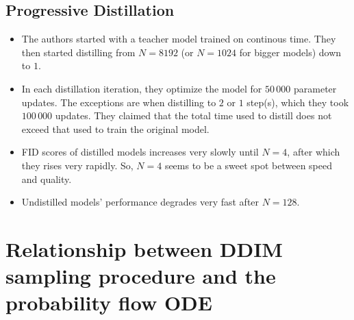 \documentclass[10pt]{article}
\begin{document}
\subsection{Progressive Distillation}

\begin{itemize}
  \item The authors started with a teacher model trained on continous time. They then started distilling from $N = 8192$ (or $N = 1024$ for bigger models) down to $1$.
  
  \item In each distillation iteration, they optimize the model for $50\,000$ parameter updates. The exceptions are when distilling to $2$ or $1$ step(s), which they took $100\,000$ updates. They claimed that the total time used to distill does not exceed that used to train the original model.
  
  \item FID scores of distilled models increases very slowly until $N = 4$, after which they rises very rapidly. So, $N = 4$ seems to be a sweet spot between speed and quality.
  
  \item Undistilled models' performance degrades very fast after $N = 128$.
\end{itemize}

\appendix

\section{Relationship between DDIM sampling procedure and the probability flow ODE}
\end{document}
